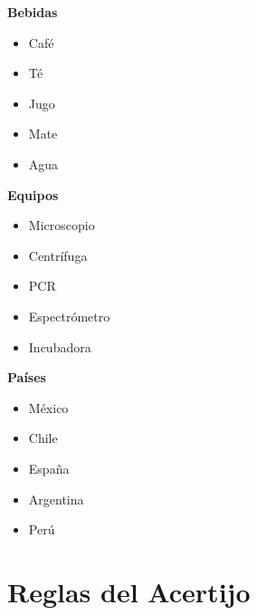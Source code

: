 \documentclass[11pt]{article}
\begin{document}
\textbf{\textbf{Bebidas}}
\begin{itemize}
\item Café
\item Té
\item Jugo
\item Mate
\item Agua
\end{itemize}

\textbf{\textbf{Equipos}}
\begin{itemize}
\item Microscopio
\item Centrífuga
\item PCR
\item Espectrómetro
\item Incubadora
\end{itemize}

\textbf{\textbf{Países}}
\begin{itemize}
\item México
\item Chile
\item España
\item Argentina
\item Perú
\end{itemize}

\section*{Reglas del Acertijo}
\label{sec:orgf9519e1}
\end{document}
